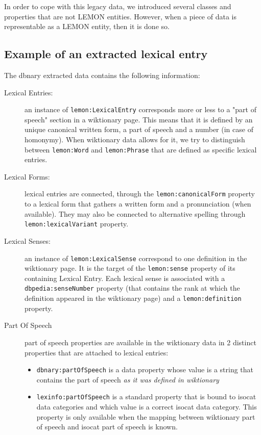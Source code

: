\documentclass[10pt, a4paper]{article}
\begin{document}
In order to cope with this legacy data, we introduced several classes and properties that are not LEMON entities. However, when a piece of data is representable as a LEMON entity, then it is done so. 

\subsection{Example of an extracted lexical entry}

The dbnary extracted data contains the following information:

\begin{description}
\item[Lexical Entries:] an instance of \texttt{lemon:LexicalEntry} corresponds more or less to a "part of speech" section in a wiktionary page. This means that it is defined by an unique canonical written form, a part of speech and a number (in case of homonymy). When wiktionary data allows for it, we try to distinguish between \texttt{lemon:Word} and \texttt{lemon:Phrase} that are defined as specific lexical entries.
\item[Lexical Forms:] lexical entries are connected, through the \texttt{lemon:canonicalForm} property to a lexical form that gathers a written form and a pronunciation (when available). They may also be connected to alternative spelling through \texttt{lemon:lexicalVariant} property. 
\item[Lexical Senses:] an instance of \texttt{lemon:LexicalSense} correspond to one definition in the wiktionary page. It is the target of the \texttt{lemon:sense} property of its containing Lexical Entry. Each lexical sense is associated with a \texttt{dbpedia:senseNumber} property (that contains the rank at which the definition appeared in the wiktionary page) and a \texttt{lemon:definition} property.
\item[Part Of Speech] part of speech properties are available in the wiktionary data in 2 distinct properties that are attached to lexical entries:
\begin{itemize}
\item \texttt{dbnary:partOfSpeech} is a data property whose value is a string that contains the part of speech \textit{as it was defined in wiktionary} 
\item \texttt{lexinfo:partOfSpeech} is a standard property that is bound to isocat data categories and which value is a correct isocat data category. This property is only available when the mapping between wiktionary part of speech and isocat part of speech is known.

\end{itemize}
\end{description}
\end{document}
